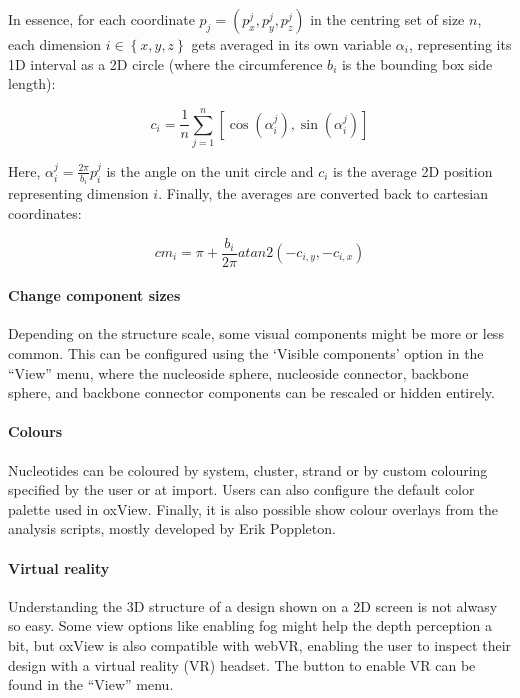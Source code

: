 
In essence, for each coordinate \(p_j = \left(p_x^j, p_y^j, p_z^j\right) \) in the centring set of size \(n\), each dimension \(i \in \left\{x,y,z\right\}\) gets averaged in its own variable \(\alpha_i\), representing its 1D interval as a 2D circle (where the circumference \(b_i\) is the bounding box side length):

\[
  c_i = \frac{1}{n} \sum_{j = 1}^{n} \left[ \cos \left( \alpha_i^j \right), \sin \left( \alpha_i^j \right) \right]  
\]

Here, \(\alpha_i^j = \frac{2 \pi}{b_i} p_i^j\) is the angle on the unit circle and \(c_i\) is the average 2D position representing dimension \(i\). Finally, the averages are converted back to cartesian coordinates:

\[
  cm_i = \pi + \frac{b_i}{2\pi} atan2(-c_{i,y}, -c_{i, x})
\]

\paragraph{Change component sizes} Depending on the structure scale, some visual components might be more or less common. This can be configured using the `Visible components' option in the ``View'' menu, where the nucleoside sphere, nucleoside connector, backbone sphere, and backbone connector components can be rescaled or hidden entirely.

\paragraph{Colours} Nucleotides can be coloured by system, cluster, strand or by custom colouring specified by the user or at import. Users can also configure the default color palette used in oxView. Finally, it is also possible show colour overlays from the analysis scripts, mostly developed by Erik Poppleton. 

\paragraph{Virtual reality} Understanding the 3D structure of a design shown on a 2D screen is not alwasy so easy. Some view options like enabling fog might help the depth perception a bit, but oxView is also compatible with webVR, enabling the user to inspect their design with a virtual reality (VR) headset. The button to enable VR can be found in the ``View'' menu.

